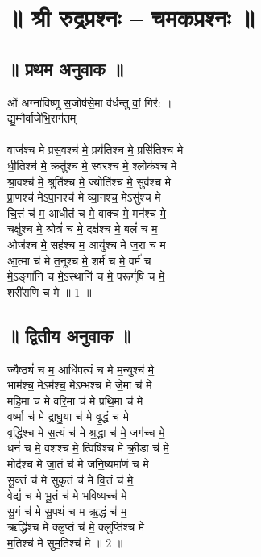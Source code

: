 \section{॥ श्री रुद्रप्रश्नः – चमकप्रश्नः ॥}
\subsection{॥ प्रथम अनुवाक ॥}
ओं अग्ना॑विष्णू स॒जोष॑से॒मा व॑र्धन्तु वां॒ गिर॑: ।\\
द्यु॒म्नैर्वाजे॑भि॒राग॑तम् ।\\
\\
वाज॑श्च मे प्रस॒वश्च॑ मे॒ प्रय॑तिश्च मे॒ प्रसि॑तिश्च मे\\
धी॒तिश्च॑ मे॒ क्रतु॑श्च मे॒ स्वर॑श्च मे॒ श्लोक॑श्च मे\\
श्रा॒वश्च॑ मे॒ श्रुति॑श्च मे॒ ज्योति॑श्च मे॒ सुव॑श्च मे\\
प्रा॒णश्च॑ मेऽपा॒नश्च॑ मे व्या॒नश्च॒ मेऽसु॑श्च मे\\
चि॒त्तं च॑ म॒ आधी॑तं च मे॒ वाक्च॑ मे॒ मन॑श्च मे॒\\
चक्षु॑श्च मे॒ श्रोत्रं॑ च मे॒ दक्ष॑श्च मे॒ बलं॑ च म॒\\
ओज॑श्च मे॒ सह॑श्च म॒ आयु॑श्च मे ज॒रा च॑ म\\
आ॒त्मा च॑ मे त॒नूश्च॑ मे॒ शर्म॑ च मे॒ वर्म॑ च\\
मे॒ऽङ्गा॑नि च मे॒ऽस्थानि॑ च मे॒ परूग्ं॑षि च मे॒\\
शरी॑राणि च मे ॥ 1 ॥\\
\subsection{॥ द्वितीय अनुवाक ॥}
ज्यैष्ठ्यं॑ च म॒ आधि॑पत्यं च मे म॒न्युश्च॑ मे॒\\
भाम॑श्च॒ मेऽम॑श्च॒ मेऽम्भ॑श्च मे जे॒मा च॑ मे\\
महि॒मा च॑ मे वरि॒मा च॑ मे प्रथि॒मा च॑ मे\\
व॒र्ष्मा च॑ मे द्राघु॒या च॑ मे वृ॒द्धं च॑ मे॒\\
वृद्धि॑श्च मे स॒त्यं च॑ मे श्र॒द्धा च॑ मे॒ जग॑च्च मे॒\\
धनं॑ च मे॒ वश॑श्च मे॒ त्विषि॑श्च मे क्री॒डा च॑ मे॒\\
मोद॑श्च मे जा॒तं च॑ मे जनि॒ष्यमा॑णं च मे\\
सू॒क्तं च॑ मे सुकृ॒तं च॑ मे वि॒त्तं च॑ मे॒\\
वेद्यं॑ च मे भू॒तं च॑ मे भवि॒ष्यच्च॑ मे\\
सु॒गं च॑ मे सु॒पथं॑ च म ऋ॒द्धं च॑ म॒\\
ऋद्धि॑श्च मे क्लु॒प्तं च॑ मे॒ क्लुप्ति॑श्च मे\\
म॒तिश्च॑ मे सुम॒तिश्च॑ मे ॥ 2 ॥\\
